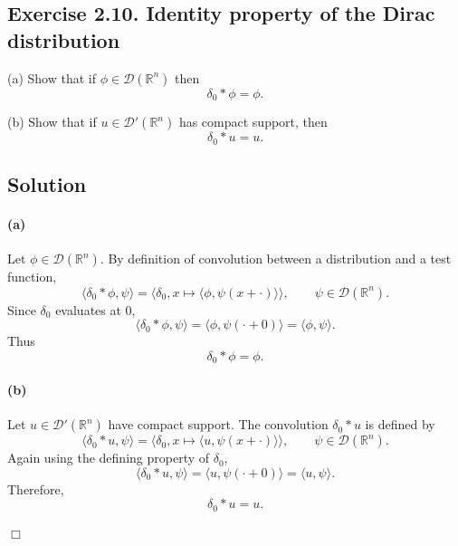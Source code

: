 \documentclass[12pt,a4paper]{article}
\theoremstyle{plain}
\theoremstyle{definition}
\theoremstyle{remark}
\theoremstyle{remark}
\begin{document}
\clearpage

\subsection*{Exercise 2.10. Identity property of the Dirac distribution}

\noindent
(a)\; Show that if $\phi \in \mathcal{D}(\mathbb{R}^n)$ then
\[
\delta_0 * \phi = \phi .
\]

\medskip
\noindent
(b)\; Show that if $u \in \mathcal{D}'(\mathbb{R}^n)$ has compact support, then
\[
\delta_0 * u = u .
\]

\subsection*{Solution}

\paragraph{(a)}  
Let $\phi \in \mathcal{D}(\mathbb{R}^n)$.  
By definition of convolution between a distribution and a test function,
\[
\langle \delta_0 * \phi , \psi \rangle
= \langle \delta_0 , x \mapsto \langle \phi , \psi(x+\cdot)\rangle \rangle,
\qquad \psi \in \mathcal{D}(\mathbb{R}^n).
\]
Since $\delta_0$ evaluates at $0$,
\[
\langle \delta_0 * \phi , \psi \rangle
= \langle \phi , \psi(\cdot + 0)\rangle
= \langle \phi , \psi \rangle .
\]
Thus
\[
\delta_0 * \phi = \phi .
\]

\paragraph{(b)}  
Let $u \in \mathcal{D}'(\mathbb{R}^n)$ have compact support.  
The convolution $\delta_0 * u$ is defined by
\[
\langle \delta_0 * u , \psi \rangle
= \langle \delta_0 , x \mapsto \langle u , \psi(x+\cdot)\rangle \rangle,
\qquad \psi \in \mathcal{D}(\mathbb{R}^n).
\]
Again using the defining property of $\delta_0$,
\[
\langle \delta_0 * u , \psi \rangle
= \langle u , \psi(\cdot + 0)\rangle
= \langle u , \psi \rangle.
\]
Therefore,
\[
\delta_0 * u = u .
\]

\hfill$\Box$
\end{document}
